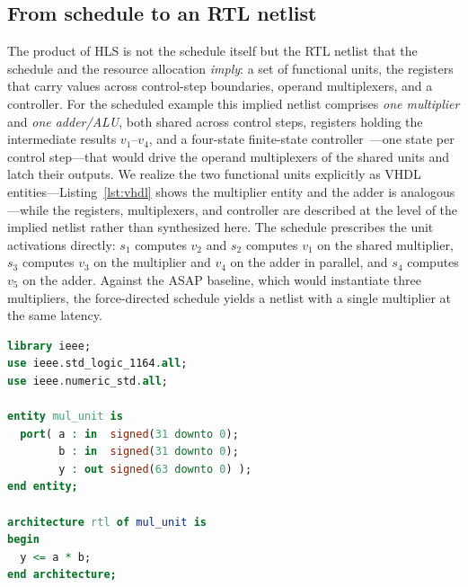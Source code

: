 \documentclass[conference]{IEEEtran}
\begin{document}
\subsection{From schedule to an RTL netlist}\label{ssec:rtl}
The product of HLS is not the schedule itself but the RTL netlist that the
schedule and the resource allocation \emph{imply}: a set of functional units, the
registers that carry values across control-step boundaries, operand
multiplexers, and a controller. For the scheduled example this implied netlist
comprises \emph{one multiplier} and \emph{one adder/ALU}, both shared across
control steps, registers holding the intermediate results $v_1$--$v_4$, and a
four-state finite-state controller~\cite{b5}---one state per control step---that
would drive the operand multiplexers of the shared units and latch their
outputs. We realize the two functional units explicitly as VHDL
entities---Listing~\ref{lst:vhdl} shows the multiplier entity and the adder is
analogous---while the registers, multiplexers, and controller are described at
the level of the implied netlist rather than synthesized here. The schedule
prescribes the unit activations directly: $s_1$ computes $v_2$ and $s_2$ computes
$v_1$ on the shared multiplier, $s_3$ computes $v_3$ on the multiplier and $v_4$
on the adder in parallel, and $s_4$ computes $v_5$ on the adder. Against the ASAP
baseline, which would instantiate three multipliers, the force-directed schedule
yields a netlist with a single multiplier at the same latency.

\begin{lstlisting}[language=VHDL,caption={Shared multiplier as a VHDL entity.},label=lst:vhdl]
library ieee;
use ieee.std_logic_1164.all;
use ieee.numeric_std.all;

entity mul_unit is
  port( a : in  signed(31 downto 0);
        b : in  signed(31 downto 0);
        y : out signed(63 downto 0) );
end entity;

architecture rtl of mul_unit is
begin
  y <= a * b;
end architecture;
\end{lstlisting}
\end{document}
